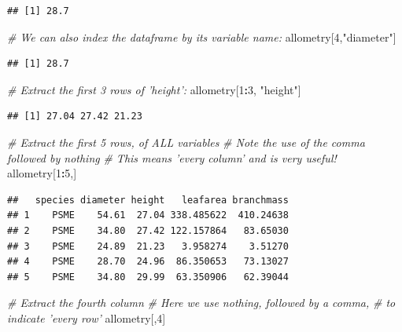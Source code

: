 \documentclass[]{book}
\newenvironment{Shaded}{\begin{snugshade}}{\end{snugshade}}
\newcommand{\CommentTok}[1]{\textcolor[rgb]{0.56,0.35,0.01}{\textit{#1}}}
\newcommand{\DecValTok}[1]{\textcolor[rgb]{0.00,0.00,0.81}{#1}}
\newcommand{\NormalTok}[1]{#1}
\newcommand{\OperatorTok}[1]{\textcolor[rgb]{0.81,0.36,0.00}{\textbf{#1}}}
\newcommand{\StringTok}[1]{\textcolor[rgb]{0.31,0.60,0.02}{#1}}
\begin{document}
\begin{verbatim}
## [1] 28.7
\end{verbatim}

\begin{Shaded}
\begin{Highlighting}[]
\CommentTok{# We can also index the dataframe by its variable name:}
\NormalTok{allometry[}\DecValTok{4}\NormalTok{,}\StringTok{"diameter"}\NormalTok{]}
\end{Highlighting}
\end{Shaded}

\begin{verbatim}
## [1] 28.7
\end{verbatim}

\begin{Shaded}
\begin{Highlighting}[]
\CommentTok{# Extract the first 3 rows of 'height':}
\NormalTok{allometry[}\DecValTok{1}\OperatorTok{:}\DecValTok{3}\NormalTok{, }\StringTok{"height"}\NormalTok{]}
\end{Highlighting}
\end{Shaded}

\begin{verbatim}
## [1] 27.04 27.42 21.23
\end{verbatim}

\begin{Shaded}
\begin{Highlighting}[]
\CommentTok{# Extract the first 5 rows, of ALL variables}
\CommentTok{# Note the use of the comma followed by nothing}
\CommentTok{# This means 'every column' and is very useful!}
\NormalTok{allometry[}\DecValTok{1}\OperatorTok{:}\DecValTok{5}\NormalTok{,]}
\end{Highlighting}
\end{Shaded}

\begin{verbatim}
##   species diameter height   leafarea branchmass
## 1    PSME    54.61  27.04 338.485622  410.24638
## 2    PSME    34.80  27.42 122.157864   83.65030
## 3    PSME    24.89  21.23   3.958274    3.51270
## 4    PSME    28.70  24.96  86.350653   73.13027
## 5    PSME    34.80  29.99  63.350906   62.39044
\end{verbatim}

\begin{Shaded}
\begin{Highlighting}[]
\CommentTok{# Extract the fourth column}
\CommentTok{# Here we use nothing, followed by a comma,}
\CommentTok{# to indicate 'every row'}
\NormalTok{allometry[,}\DecValTok{4}\NormalTok{]}
\end{Highlighting}
\end{Shaded}
\end{document}
